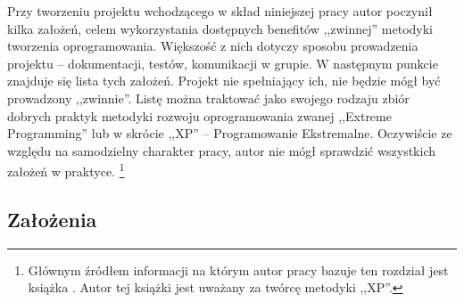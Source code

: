 Przy tworzeniu projektu wchodzącego w skład niniejszej pracy autor poczynił kilka założeń, celem wykorzystania dostępnych benefitów ,,zwinnej'' metodyki tworzenia oprogramowania. Większość z nich dotyczy sposobu prowadzenia projektu -- dokumentacji, testów, komunikacji w grupie. W następnym punkcie znajduje się lista tych założeń. Projekt nie spełniający ich, nie będzie mógł być prowadzony ,,zwinnie''. Listę można traktować jako swojego rodzaju zbiór dobrych praktyk metodyki rozwoju oprogramowania zwanej ,,Extreme Programming'' lub w skrócie ,,XP'' -- Programowanie Ekstremalne. Oczywiście ze względu na samodzielny charakter pracy, autor nie mógł sprawdzić wszystkich założeń w praktyce. \footnote{Głównym źródłem informacji na którym autor pracy bazuje ten rozdział jest książka \cite{Bec99}. Autor tej książki jest uważany za twórcę metodyki ,,XP''.}


\subsection{Założenia}
\label{sec:ZMTOzalozenia}


